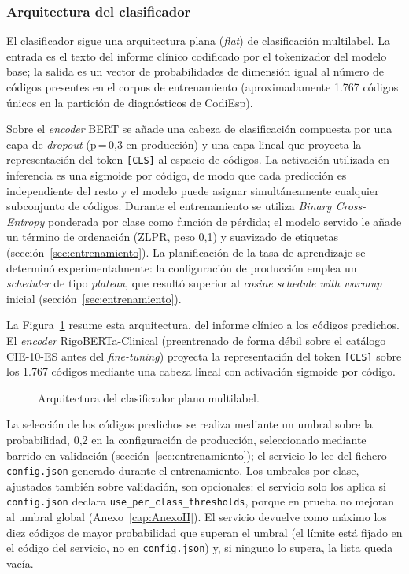 \subsubsection{Arquitectura del clasificador}

El clasificador sigue una arquitectura plana (\emph{flat}) de clasificación multilabel. La entrada es el texto del informe clínico codificado por el tokenizador del modelo base; la salida es un vector de probabilidades de dimensión igual al número de códigos presentes en el corpus de entrenamiento (aproximadamente 1.767 códigos únicos en la partición de diagnósticos de CodiEsp).

Sobre el \emph{encoder} BERT se añade una cabeza de clasificación compuesta por una capa de \emph{dropout} (p\,=\,0,3 en producción) y una capa lineal que proyecta la representación del token \texttt{[CLS]} al espacio de códigos. La activación utilizada en inferencia es una sigmoide por código, de modo que cada predicción es independiente del resto y el modelo puede asignar simultáneamente cualquier subconjunto de códigos. Durante el entrenamiento se utiliza \emph{Binary Cross-Entropy} ponderada por clase como función de pérdida; el modelo servido le añade un término de ordenación (ZLPR, peso 0,1) y suavizado de etiquetas (sección~\ref{sec:entrenamiento}). La planificación de la tasa de aprendizaje se determinó experimentalmente: la configuración de producción emplea un \emph{scheduler} de tipo \emph{plateau}, que resultó superior al \emph{cosine schedule with warmup} inicial (sección~\ref{sec:entrenamiento}).

La Figura~\ref{fig:arq-clasificador} resume esta arquitectura, del informe clínico a los códigos predichos. El \emph{encoder} RigoBERTa-Clinical (preentrenado de forma débil sobre el catálogo CIE-10-ES antes del \emph{fine-tuning}) proyecta la representación del token \texttt{[CLS]} sobre los 1.767 códigos mediante una cabeza lineal con activación sigmoide por código.

\begin{figure}[ht]
\centering
\resizebox{\textwidth}{!}{}
\caption{Arquitectura del clasificador plano multilabel.}
\label{fig:arq-clasificador}
\end{figure}

La selección de los códigos predichos se realiza mediante un umbral sobre la probabilidad, 0,2 en la configuración de producción, seleccionado mediante barrido en validación (sección~\ref{sec:entrenamiento}); el servicio lo lee del fichero \texttt{config.json} generado durante el entrenamiento. Los umbrales por clase, ajustados también sobre validación, son opcionales: el servicio solo los aplica si \texttt{config.json} declara \texttt{use\_per\_class\_thresholds}, porque en prueba no mejoran al umbral global (Anexo~\ref{cap:AnexoH}). El servicio devuelve como máximo los diez códigos de mayor probabilidad que superan el umbral (el límite está fijado en el código del servicio, no en \texttt{config.json}) y, si ninguno lo supera, la lista queda vacía.

